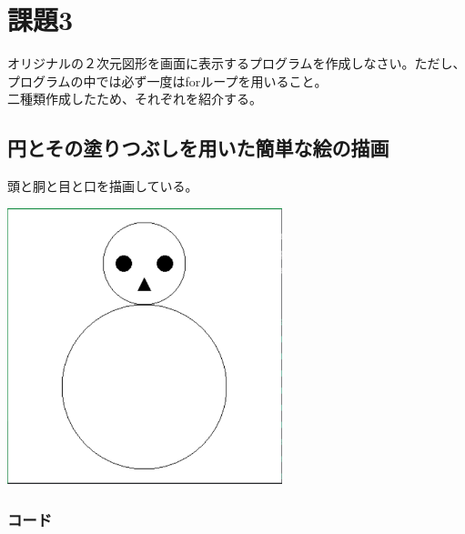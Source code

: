 \documentclass{scrartcl}
\begin{document}
\newpage

\section{課題3}
\label{sec:orgd1320ba}
オリジナルの２次元図形を画面に表示するプログラムを作成しなさい。ただし、プログラムの中では必ず一度はforループを用いること。\\
二種類作成したため、それぞれを紹介する。\\

\subsection{円とその塗りつぶしを用いた簡単な絵の描画}
\label{sec:org27cae10}
頭と胴と目と口を描画している。\\

\begin{center}
\includegraphics[width=8cm]{./2017-10-03-08.png}
\end{center}


\subsubsection{コード}
\label{sec:org749c0da}
\end{document}
